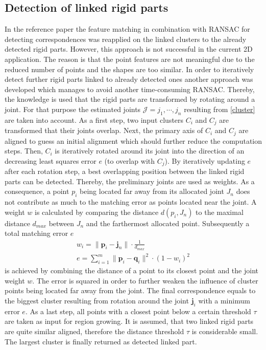 \subsection{Detection of linked rigid parts}
\label{JointWeights}
In the reference paper the feature matching in combination with RANSAC for detecting correspondences was reapplied on the linked clusters to the already detected rigid parts. However, this approach is not successful in the current 2D application. The reason is that the point features are not meaningful due to the reduced number of points and the shapes are too similar. In order to iteratively detect further rigid parts linked to already detected ones another approach was developed which manages to avoid another time-consuming RANSAC. Thereby, the knowledge is used that the rigid parts are transformed by rotating around a joint. For that purpose the estimated joints $\mathcal{J} = j_1,\cdots,j_n$ resulting from \ref{cluster} are taken into account. As a first step, two input clusters $C_i$ and $C_j$ are transformed that their joints overlap. Next, the primary axis of $C_i$ and $C_j$ are aligned to guess an initial alignment which should further reduce the computation steps. Then, $C_i$ is iteratively rotated around its joint into the direction of an decreasing least squares error $e$ (to overlap with $C_j$). By iteratively updating $e$ after each rotation step, a best overlapping position between the linked rigid parts can be detected. Thereby, the preliminary joints are used as weights. As a consequence, a point $p_i$ being located far away from its allocated joint $J_n$ does not contribute as much to the matching error as points located near the joint. A weight $w$ is calculated by comparing the distance $d(p_i, J_n)$ to the maximal distance $d_{max}$ between $J_n$ and the farthermost allocated point. Subsequently a total matching error $e$
%
\begin{equation}
\begin{split}
w_i = \| \boldsymbol{p}_i - \boldsymbol{j}_n\| \cdot \frac{1}{d_{max}}
\\
e = \displaystyle\sum_{i=1}^{m}\| \boldsymbol{p}_i - \boldsymbol{q}_i\|^2 \cdot (1 - {w_i})^2
\end{split}
\label{eq:jointWeightError}
\end{equation}
%
is achieved by combining the distance of a point to its closest point and the joint weight $w$. The error is squared in order to further weaken the influence of cluster points being located far away from the joint. The final correspondence equals to the biggest cluster resulting from rotation around the joint $\boldsymbol{j}_i$ with a minimum error $e$. As a last step, all points with a closest point below a certain threshold $\tau$ are taken as input for region growing. It is assumed, that two linked rigid parts are quite similar aligned, therefore the distance threshold $\tau$ is considerable small. The largest cluster is finally returned as detected linked part.
